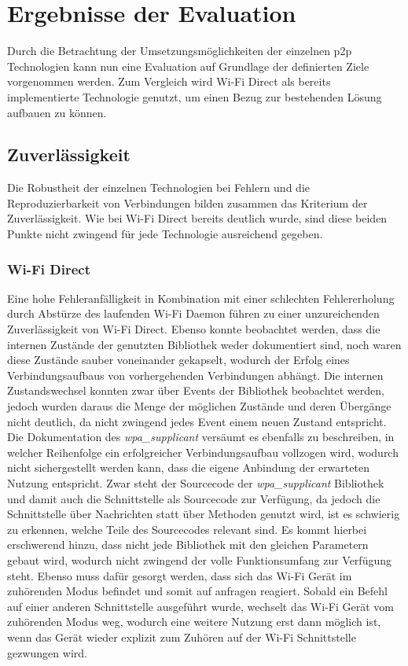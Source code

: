 \section{Ergebnisse der Evaluation}
		Durch die Betrachtung der Umsetzungsmöglichkeiten der einzelnen p2p Technologien kann nun eine Evaluation auf Grundlage der definierten Ziele vorgenommen werden. Zum Vergleich wird Wi-Fi Direct als bereits implementierte Technologie genutzt, um einen Bezug zur bestehenden Lösung aufbauen zu können.
		\subsection{Zuverlässigkeit}
		Die Robustheit der einzelnen Technologien bei Fehlern und die Reproduzierbarkeit von Verbindungen bilden zusammen das Kriterium der Zuverlässigkeit. Wie bei Wi-Fi Direct bereits deutlich wurde, sind diese beiden Punkte nicht zwingend für jede Technologie ausreichend gegeben.
		
		\subsubsection{Wi-Fi Direct} Eine hohe Fehleranfälligkeit in Kombination mit einer schlechten Fehlererholung durch Abstürze des laufenden Wi-Fi Daemon führen zu einer unzureichenden Zuverlässigkeit von Wi-Fi Direct. Ebenso konnte beobachtet werden, dass die internen Zustände der genutzten Bibliothek weder dokumentiert sind, noch waren diese Zustände sauber voneinander gekapselt, wodurch der Erfolg eines Verbindungsaufbaus von vorhergehenden Verbindungen abhängt. Die internen Zustandswechsel konnten zwar über Events der Bibliothek beobachtet werden, jedoch wurden daraus die Menge der möglichen Zustände und deren Übergänge nicht deutlich, da nicht zwingend jedes Event einem neuen Zustand entspricht. Die Dokumentation des {\it wpa\_supplicant} versäumt es ebenfalls zu beschreiben, in welcher Reihenfolge ein erfolgreicher Verbindungsaufbau vollzogen wird, wodurch nicht sichergestellt werden kann, dass die eigene Anbindung der erwarteten Nutzung entspricht.
		Zwar steht der Sourcecode der {\it wpa\_supplicant} Bibliothek und damit auch die Schnittstelle als Sourcecode zur Verfügung, da jedoch die Schnittstelle über Nachrichten statt über Methoden genutzt wird, ist es schwierig zu erkennen, welche Teile des Sourcecodes relevant sind. Es kommt hierbei erschwerend hinzu, dass nicht jede Bibliothek mit den gleichen Parametern gebaut wird, wodurch nicht zwingend der volle Funktionsumfang zur Verfügung steht. Ebenso muss dafür gesorgt werden, dass sich das Wi-Fi Gerät im zuhörenden Modus befindet und somit auf anfragen reagiert. Sobald ein Befehl auf einer anderen Schnittstelle ausgeführt wurde, wechselt das Wi-Fi Gerät vom zuhörenden Modus weg, wodurch eine weitere Nutzung erst dann möglich ist, wenn das Gerät wieder explizit zum Zuhören auf der Wi-Fi Schnittstelle gezwungen wird.
		
